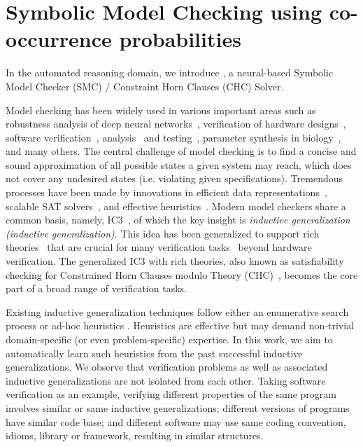 \section{Symbolic Model Checking using co-occurrence probabilities}
In the automated reasoning domain, we introduce \dpy, a neural-based Symbolic Model Checker (SMC) / Constraint Horn Clauses (CHC) Solver.

Model checking has been widely used in various important areas such as robustness analysis of deep neural networks~\cite{Katz:cav19}, verification of hardware designs~\cite{SMC96}, software verification~\cite{Ball02}, analysis~\cite{ESC-java-02} and testing~\cite{Sheyner:SP02}, parameter synthesis in biology~\cite{Barnat:biology12}, and many others. 
The central challenge of model checking is to find a concise and sound approximation of all possible states a given system may reach, which does not cover any undesired states (i.e. violating given specifications). 
Tremendous processes have been made by innovations in efficient data representations~\cite{BDD}, scalable SAT solvers~\cite{CDCL,chaff,minisat}, and effective heuristics~\cite{CEGAR,BMC,McMillan:cav06}.  
Modern model checkers share a common basis, namely, IC3~\cite{IC3}, of which the key insight is \textit{inductive generalization (inductive generalization)}.
This idea has been generalized to support rich theories~\cite{GPDR} that are crucial for many verification tasks~\cite{Komuravelli:cav13,SeaHorn} beyond hardware verification. 
The generalized IC3 with rich theories, also known as satisfiability checking for Constrained Horn Clauses modulo Theory
(CHC)~\cite{DBLP:conf/birthday/BjornerGMR15}, becomes the core part of a broad range of verification tasks.



Existing inductive generalization techniques follow either an enumerative search process \cite{IC3,Bradley:fmcad11} or ad-hoc heuristics \cite{Griggio:CAD16,GSpacer}. 
Heuristics are effective but may demand non-trivial domain-specific (or even problem-specific) expertise. 
In this work, we aim to automatically learn such heuristics from the past successful inductive generalizations. 
We observe that verification problems as well as associated inductive generalizations are not isolated from each other. 
Taking software verification as an example, verifying different properties of the same program involves similar or same inductive generalizations; different versions of programs have similar code base; and
different software may use same coding convention, idioms, library or framework, resulting in similar structures.


